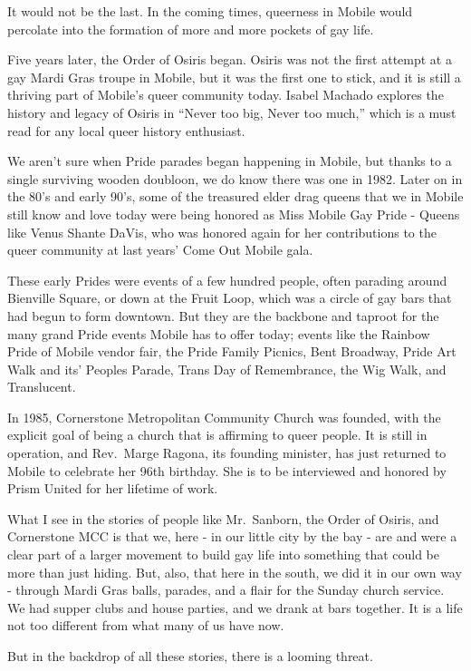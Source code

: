 \documentclass[
]{book}
\begin{document}
It would not be the last. In the coming times, queerness in Mobile would percolate into the formation of more and more pockets of gay life.

Five years later, the Order of Osiris began. Osiris was not the first attempt at a gay Mardi Gras troupe in Mobile, but it was the first one to stick, and it is still a thriving part of Mobile's queer community today. Isabel Machado explores the history and legacy of Osiris in ``Never too big, Never too much,'' which is a must read for any local queer history enthusiast.

We aren't sure when Pride parades began happening in Mobile, but thanks to a single surviving wooden doubloon, we do know there was one in 1982. Later on in the 80's and early 90's, some of the treasured elder drag queens that we in Mobile still know and love today were being honored as Miss Mobile Gay Pride - Queens like Venus Shante DaVis, who was honored again for her contributions to the queer community at last years' Come Out Mobile gala.

These early Prides were events of a few hundred people, often parading around Bienville Square, or down at the Fruit Loop, which was a circle of gay bars that had begun to form downtown. But they are the backbone and taproot for the many grand Pride events Mobile has to offer today; events like the Rainbow Pride of Mobile vendor fair, the Pride Family Picnics, Bent Broadway, Pride Art Walk and its' Peoples Parade, Trans Day of Remembrance, the Wig Walk, and Translucent.

In 1985, Cornerstone Metropolitan Community Church was founded, with the explicit goal of being a church that is affirming to queer people. It is still in operation, and Rev.~Marge Ragona, its founding minister, has just returned to Mobile to celebrate her 96th birthday. She is to be interviewed and honored by Prism United for her lifetime of work.

What I see in the stories of people like Mr.~Sanborn, the Order of Osiris, and Cornerstone MCC is that we, here - in our little city by the bay - are and were a clear part of a larger movement to build gay life into something that could be more than just hiding. But, also, that here in the south, we did it in our own way - through Mardi Gras balls, parades, and a flair for the Sunday church service. We had supper clubs and house parties, and we drank at bars together. It is a life not too different from what many of us have now.

But in the backdrop of all these stories, there is a looming threat.
\end{document}
